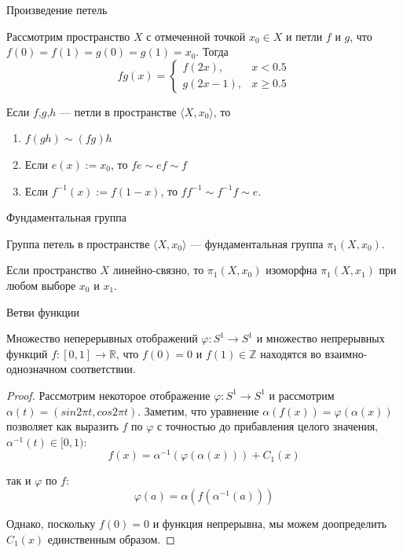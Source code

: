 \documentclass[aspectratio=169,dvipsnames,usenames]{beamer}
\begin{document}
\begin{frame}{Произведение петель}
\begin{dfn}
Рассмотрим пространство $X$ с отмеченной точкой $x_0 \in X$ и петли $f$ и $g$, что $f(0) = f(1) = g(0) = g(1) = x_0$.
Тогда $$fg (x) = \left\{\begin{array}{ll}f(2x),&x < 0.5\\g(2x-1),&x \ge 0.5\end{array}\right.$$
\end{dfn}
\begin{thm}
Если $f$,$g$,$h$ --- петли в пространстве $\langle X, x_0\rangle$, то \begin{enumerate}
\item $f(gh) \sim (fg)h$
\item Если $e(x) := x_0$, то $fe \sim ef \sim f$
\item Если $f^{-1}(x) := f(1-x)$, то $ff^{-1} \sim f^{-1}f \sim e$.
\end{enumerate}
\end{thm}
\end{frame}

\begin{frame}{Фундаментальная группа}
\begin{dfn}
Группа петель в пространстве $\langle X, x_0\rangle$ --- фундаментальная группа $\pi_1(X,x_0)$.
\end{dfn}

\begin{thm}
Если пространство $X$ линейно-связно, то $\pi_1(X,x_0)$ изоморфна $\pi_1(X,x_1)$ при любом выборе $x_0$ и $x_1$.
\end{thm}
\end{frame}

\begin{frame}{Ветви функции}
\begin{thm}Множество неперерывных отображений $\varphi: S^1 \rightarrow S^1$ и множество непрерывных 
функций $f: [0,1] \rightarrow \mathbb{R}$, что $f(0)=0$ и $f(1) \in \mathbb{Z}$
находятся во взаимно-однозначном соответствии.
\end{thm}

\begin{proof}
Рассмотрим некоторое отображение $\varphi: S^1\rightarrow S^1$ и рассмотрим $\alpha(t) = (sin 2\pi t, cos 2\pi t)$.
Заметим, что уравнение $\alpha(f(x)) = \varphi(\alpha(x))$ позволяет как выразить $f$ по $\varphi$ с точностью
до прибавления целого значения, $\alpha^{-1}(t) \in [0,1)$:
$$f(x) = \alpha^{-1}(\varphi(\alpha(x)))+C_1(x)$$

так и $\varphi$ по $f$: $$\varphi(a) = \alpha(f(\alpha^{-1}(a)))$$

Однако, поскольку $f(0) = 0$ и функция непрерывна, мы можем доопределить $C_1(x)$ единственным образом.
\end{proof}
\end{frame}
\end{document}
